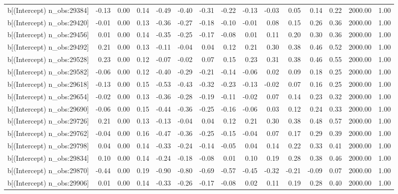 \begin{table}[ht]
\begin{tabular}{rrrrrrrrrrrrrrr}
  b[(Intercept) n\_obs:29384] & -0.13 & 0.00 & 0.14 & -0.49 & -0.40 & -0.31 & -0.22 & -0.13 & -0.03 & 0.05 & 0.14 & 0.22 & 2000.00 & 1.00 \\ 
  b[(Intercept) n\_obs:29420] & -0.01 & 0.00 & 0.13 & -0.36 & -0.27 & -0.18 & -0.10 & -0.01 & 0.08 & 0.15 & 0.26 & 0.36 & 2000.00 & 1.00 \\ 
  b[(Intercept) n\_obs:29456] & 0.01 & 0.00 & 0.14 & -0.35 & -0.25 & -0.17 & -0.08 & 0.01 & 0.11 & 0.20 & 0.30 & 0.36 & 2000.00 & 1.00 \\ 
  b[(Intercept) n\_obs:29492] & 0.21 & 0.00 & 0.13 & -0.11 & -0.04 & 0.04 & 0.12 & 0.21 & 0.30 & 0.38 & 0.46 & 0.52 & 2000.00 & 1.00 \\ 
  b[(Intercept) n\_obs:29528] & 0.23 & 0.00 & 0.12 & -0.07 & -0.02 & 0.07 & 0.15 & 0.23 & 0.31 & 0.38 & 0.46 & 0.55 & 2000.00 & 1.00 \\ 
  b[(Intercept) n\_obs:29582] & -0.06 & 0.00 & 0.12 & -0.40 & -0.29 & -0.21 & -0.14 & -0.06 & 0.02 & 0.09 & 0.18 & 0.25 & 2000.00 & 1.00 \\ 
  b[(Intercept) n\_obs:29618] & -0.13 & 0.00 & 0.15 & -0.53 & -0.43 & -0.32 & -0.23 & -0.13 & -0.02 & 0.07 & 0.16 & 0.25 & 2000.00 & 1.00 \\ 
  b[(Intercept) n\_obs:29654] & -0.02 & 0.00 & 0.13 & -0.36 & -0.28 & -0.19 & -0.11 & -0.02 & 0.07 & 0.14 & 0.23 & 0.32 & 2000.00 & 1.00 \\ 
  b[(Intercept) n\_obs:29690] & -0.06 & 0.00 & 0.15 & -0.44 & -0.36 & -0.25 & -0.16 & -0.06 & 0.03 & 0.12 & 0.24 & 0.33 & 2000.00 & 1.00 \\ 
  b[(Intercept) n\_obs:29726] & 0.21 & 0.00 & 0.13 & -0.13 & -0.04 & 0.04 & 0.12 & 0.21 & 0.30 & 0.38 & 0.48 & 0.57 & 2000.00 & 1.00 \\ 
  b[(Intercept) n\_obs:29762] & -0.04 & 0.00 & 0.16 & -0.47 & -0.36 & -0.25 & -0.15 & -0.04 & 0.07 & 0.17 & 0.29 & 0.39 & 2000.00 & 1.00 \\ 
  b[(Intercept) n\_obs:29798] & 0.04 & 0.00 & 0.14 & -0.33 & -0.24 & -0.14 & -0.05 & 0.04 & 0.14 & 0.22 & 0.33 & 0.41 & 2000.00 & 1.00 \\ 
  b[(Intercept) n\_obs:29834] & 0.10 & 0.00 & 0.14 & -0.24 & -0.18 & -0.08 & 0.01 & 0.10 & 0.19 & 0.28 & 0.38 & 0.46 & 2000.00 & 1.00 \\ 
  b[(Intercept) n\_obs:29870] & -0.44 & 0.00 & 0.19 & -0.90 & -0.80 & -0.69 & -0.57 & -0.45 & -0.32 & -0.21 & -0.09 & 0.07 & 2000.00 & 1.00 \\ 
  b[(Intercept) n\_obs:29906] & 0.01 & 0.00 & 0.14 & -0.33 & -0.26 & -0.17 & -0.08 & 0.02 & 0.11 & 0.19 & 0.28 & 0.40 & 2000.00 & 1.00 \\ 

\end{tabular}
\end{table}
